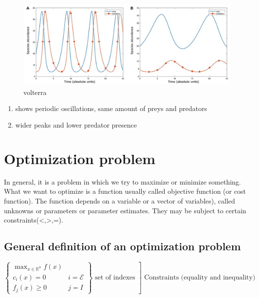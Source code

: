 \begin{figure}
\centering
\includegraphics{volterra.png}
\caption{volterra}
\end{figure}

\begin{enumerate}
\def\labelenumi{\Alph{enumi})}
\item
  shows periodic oscillations, same amount of preys and predators
\item
  wider peaks and lower predator presence
\end{enumerate}

\hypertarget{optimization-problem}{%
\section{Optimization problem}\label{optimization-problem}}

In general, it is a problem in which we try to maximize or minimize
something. What we want to optimize is a function usually called
objective function (or cost function). The function depends on a
variable or a vector of variables), called unknowns or parameters or
parameter estimates. They may be subject to certain
constraints(\textless,\textgreater,=).

\hypertarget{general-definition-of-an-optimization-problem}{%
\subsection{General definition of an optimization
problem}\label{general-definition-of-an-optimization-problem}}

$\left.\left\{\begin{array}{ll} \max _{x \in \mathbb{R}^n} f(x) & \\ c_i(x)=0 & i=\mathcal{E}\\ f_j(x) \geq 0 & j = I \end{array}\right\} \text { set of indexes }\right] \text { Constraints (equality and inequality) }$

